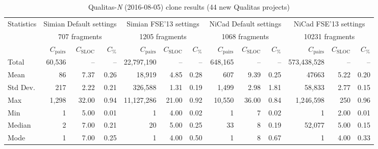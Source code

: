 \documentclass{sig-alternate-05-2015}
\begin{document}
\begin{table}
	\centering
	\caption{Qualitas-\textit{N} (2016-08-05) clone results (44 new Qualitas projects)}
	\label{t_simian_raw_results}
	\small
		\begin{tabular}{l|r|r|r|r|r|r|r|r|r|r|r|r}
			\hline
			\multirow{3}{*}{Statistics} 
			& \multicolumn{3}{c|}{Simian Default settings} 
			& \multicolumn{3}{c|}{Simian FSE'13 settings} 
			& \multicolumn{3}{c|}{NiCad Default settings} 
			& \multicolumn{3}{c}{NiCad FSE'13 settings} \\ \cline{2-13} 
			& \multicolumn{3}{c|}{707 fragments} 
			& \multicolumn{3}{c|}{1205 fragments} 
			& \multicolumn{3}{c|}{1068 fragments} 
			& \multicolumn{3}{c}{10231 fragments} \\  \cline{2-13}
			& $C_{\mathrm{pairs}}$ & $C_{\mathrm{SLOC}}$ & $C_{\mathrm{\%}}$ 
			& $C_{\mathrm{pairs}}$ & $C_{\mathrm{SLOC}}$ & $C_{\mathrm{\%}}$
			& $C_{\mathrm{pairs}}$ & $C_{\mathrm{SLOC}}$ & $C_{\mathrm{\%}}$ 
			& $C_{\mathrm{pairs}}$ & $C_{\mathrm{SLOC}}$ & $C_{\mathrm{\%}}$ \\
			\hline
			Total & 60,536 & -- 	& -- 	& 22,797,190 & -- 	& --  & 648,165 & -- & -- & 573,438,528 & -- & -- \\ 
			Mean 	& 86 	& 7.37 	& 0.26 	& 18,919 	& 4.85 	& 0.28 & 607 & 9.39 & 0.25 & 47663 & 5.22 & 0.20 \\
			Std Dev. & 217 	& 2.22 	& 0.21 	& 326,588 	& 1.31 	& 0.19 & 1,499 & 2.98 & 1.81 & 58,833 & 2.77 & 0.15 \\
			Max 	& 1,298 & 32.00 & 0.94 & 11,127,286 & 21.00 & 0.92 & 10,550 & 36.00 & 0.84 & 1,246,598 & 250 & 0.96 \\
			Min 	& 1 	& 5.00 	& 0.01 	& 1 & 4.00 	& 0.02 & 1 & 7 & 0.02 & 1 & 2.00 & 0.01\\
			Median 	& 2 & 7.00 	& 0.21 	& 20		& 5.00 	& 0.25 & 33 & 8 & 0.19 & 52,077 & 5.00 & 0.15 \\
			Mode & 1 	& 7.00 	& 0.25 	& 1 		& 4.00 	& 0.50 & 1 & 8 & 0.67 & 1 & 4.00 & 0.33 \\
			\hline
		\end{tabular} %
\end{table}
\end{document}
